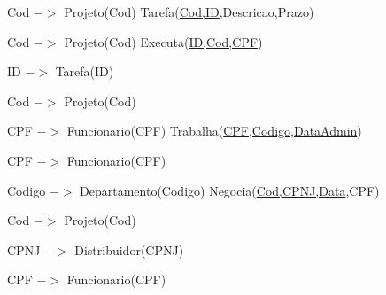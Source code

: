 \documentclass{article}
\begin{document}
\hspace{2cm}Cod $->$ Projeto(Cod)
\newline\newline
Tarefa(\underline{Cod,ID},Descricao,Prazo)


\hspace{2cm}Cod $->$ Projeto(Cod)
\newline\newline
Executa(\underline{ID,Cod,CPF})

\hspace{2cm}ID $->$ Tarefa(ID)

\hspace{2cm}Cod $->$ Projeto(Cod)

\hspace{2cm}CPF $->$ Funcionario(CPF)
\newline\newline
Trabalha(\underline{CPF,Codigo,DataAdmin})

\hspace{2cm}CPF $->$ Funcionario(CPF)

\hspace{2cm}Codigo $->$ Departamento(Codigo)
\newline\newline
Negocia(\underline{Cod,CPNJ,Data},CPF)

\hspace{2cm}Cod $->$ Projeto(Cod)

\hspace{2cm}CPNJ $->$ Distribuidor(CPNJ)

\hspace{2cm}CPF $->$ Funcionario(CPF)
\newline\newline
\end{document}
